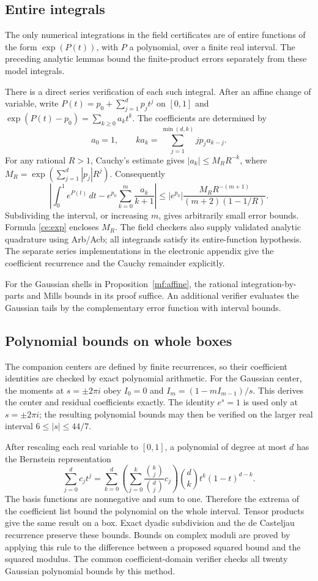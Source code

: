 \documentclass[11pt,reqno]{amsart}
\numberwithin{equation}{section}
\theoremstyle{definition}
\theoremstyle{remark}
\begin{document}
\subsection{Entire integrals}

The only numerical integrations in the field certificates are of
entire functions of the form $\exp(P(t))$, with $P$ a polynomial,
over a finite real interval. The preceding analytic lemmas bound the
finite-product errors separately from these model integrals.

There is a direct series verification of each such integral. After
an affine change of variable, write
$P(t)=p_0+\sum_{j=1}^d p_jt^j$ on $[0,1]$ and
$\exp(P(t)-p_0)=\sum_{k\ge0}a_kt^k$.
The coefficients are determined by
\[
 a_0=1,\qquad
 ka_k=\sum_{j=1}^{\min(d,k)}jp_ja_{k-j}.
\]
For any rational $R>1$, Cauchy's estimate gives
$|a_k|\le M_RR^{-k}$, where
$M_R=\exp(\sum_{j=1}^d|p_j|R^j)$.
Consequently
\[
 \left|\int_0^1e^{P(t)}\,dt
       -e^{p_0}\sum_{k=0}^{m}\frac{a_k}{k+1}\right|
 \le |e^{p_0}|
       \frac{M_RR^{-(m+1)}}{(m+2)(1-1/R)}.
\]
Subdividing the interval, or increasing $m$, gives arbitrarily
small error bounds. Formula \eqref{ce:exp} encloses $M_R$.
The field checkers also supply validated analytic quadrature
using Arb/Acb; all integrands satisfy its entire-function
hypothesis. The separate series implementations in the
electronic appendix give the coefficient recurrence and the
Cauchy remainder explicitly.

For the Gaussian shells in Proposition~\ref{mf:affine}, the rational
integration-by-parts and Mills bounds in its proof suffice.
An additional verifier evaluates the Gaussian tails by the
complementary error function with interval bounds.

\subsection{Polynomial bounds on whole boxes}

The companion centers are defined by finite recurrences, so their
coefficient identities are checked by exact polynomial arithmetic.
For the Gaussian center, the moments
at $s=\pm2\pi i$ obey $I_0=0$ and
$I_m=(1-mI_{m-1})/s$. This derives the center and residual
coefficients exactly. The identity $e^s=1$ is used only at
$s=\pm2\pi i$; the resulting polynomial bounds may then be
verified on the larger real interval $6\le |s|\le44/7$.

After rescaling each real variable to $[0,1]$, a polynomial of
degree at most $d$ has the Bernstein representation
\[
 \sum_{j=0}^dc_jt^j
 =\sum_{k=0}^d\left(\sum_{j=0}^k
           \frac{\binom{k}{j}}{\binom{d}{j}}c_j\right)
          \binom{d}{k}t^k(1-t)^{d-k}.
\]
The basis functions are nonnegative and sum to one. Therefore
the extrema of the coefficient list bound the polynomial
on the whole interval. Tensor products give the same result
on a box. Exact dyadic subdivision and the de Casteljau
recurrence preserve these bounds. Bounds on complex moduli
are proved by applying this rule to the difference between
a proposed squared bound and the squared modulus.
The common coefficient-domain verifier checks all twenty
Gaussian polynomial bounds by this method.
\end{document}
